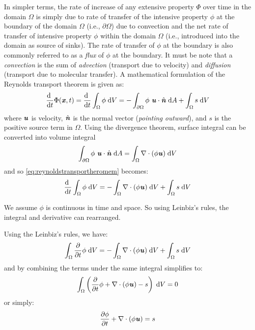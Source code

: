 In simpler terms, the rate of increase of any extensive property $\Phi$ over time in the domain $\Omega$ is simply due to rate of transfer of the intensive property $\phi$ at the boundary of the domain $\Omega$ (i.e., $\partial \Omega$) due to convection and the net rate of transfer of intensive property $\phi$ within the domain $\Omega$ (i.e., introduced into the domain as source of sinks). The rate of transfer of $\phi$ at the boundary is also commonly referred to as a \textit{flux} of $\phi$ at the boundary. It must be note that a \textit{convection} is the sum of \textit{advection} (transport due to velocity) and \textit{diffusion} (transport due to molecular transfer). A mathematical formulation of the Reynolds transport theorem is given as:
\begin{equation}
\frac{\mathrm{d}~}{\mathrm{d}t} \Phi (\textbf{\textit{x}},t) = \frac{\mathrm{d}~}{\mathrm{d}t}\int_{\Omega} \phi\;\mathrm{d}V = -\int_{\partial\Omega} \phi~\textbf{\textit{u}}\cdot\hat{\textbf{\textit{n}}}\;\mathrm{d}A + \int_{\Omega} s\;\mathrm{d}V
\label{eq:reynoldstransportheromem}
\end{equation}
where $\textbf{\textit{u}}$ is velocity, $\hat{\textbf{\textit{n}}}$ is the normal vector (\textit{pointing outward}), and $s$ is the positive source term in $\Omega$. Using the divergence theorem,  surface integral can be converted into volume integral
\begin{equation}
\int_{\partial\Omega} \phi~\textbf{\textit{u}}\cdot\hat{\textbf{\textit{n}}}\;\mathrm{d}A = \int_{\Omega} \nabla \cdot (\phi\textbf{\textit{u}})\;\mathrm{d}V
\end{equation}
and so \ref{eq:reynoldstransportheromem} becomes:
\begin{equation}
\frac{\mathrm{d}~}{\mathrm{d}t}\int_{\Omega} \phi\;\mathrm{d}V = -\int_{\Omega} \nabla \cdot (\phi\textbf{\textit{u}})\;\mathrm{d}V + \int_{\Omega} s\;\mathrm{d}V
\end{equation}

\begin{assumption}
We assume $\phi$ is continuous in time and space. So using Leinbiz's rules, the integral and derivative can rearranged.
\end{assumption}

Using the Leinbiz's rules, we have:
\begin{equation}
\int_{\Omega}  \frac{\partial}{\partial t}\phi\;\mathrm{d}V = -\int_{\Omega} \nabla \cdot (\phi\textbf{\textit{u}})\;\mathrm{d}V + \int_{\Omega} s\;\mathrm{d}V
\end{equation}
and by combining the terms under the same integral simplifies to:
\begin{equation}
\int_{\Omega}  \left(\frac{\partial}{\partial t}\phi + \nabla \cdot (\phi\textbf{\textit{u}}) - s\right)\;\mathrm{d}V = 0
\end{equation}
or simply:
\begin{equation}
\frac{\partial \phi}{\partial t} + \nabla \cdot (\phi\textbf{\textit{u}}) = s
\end{equation}

